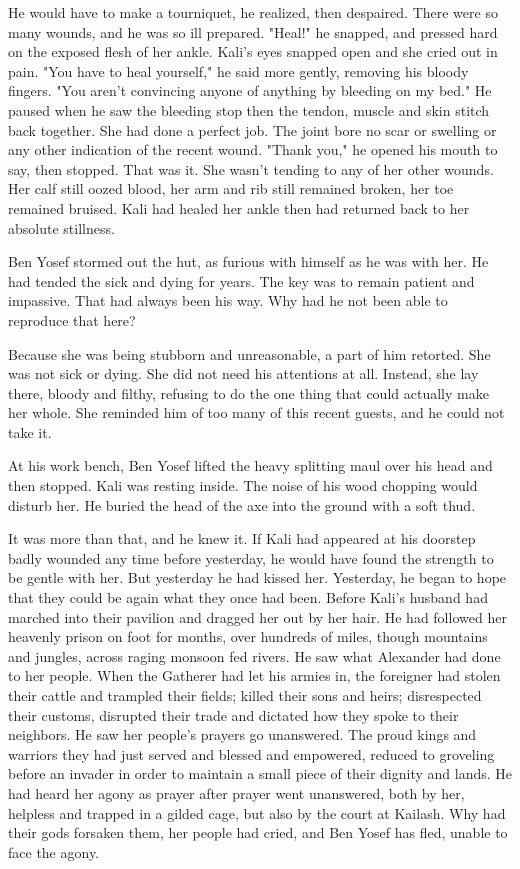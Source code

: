 \documentclass{amsart}
\begin{document}
He would have to make a tourniquet, he realized, then despaired. There were so many wounds, and he was so ill prepared. "Heal!" he snapped, and pressed hard on the exposed flesh of her ankle. Kali's eyes snapped open and she cried out in pain. "You have to heal yourself," he said more gently, removing his bloody fingers. "You aren't convincing anyone of anything by bleeding on my bed." He paused when he saw the bleeding stop then the tendon, muscle and skin stitch back together. She had done a perfect job. The joint bore no scar or swelling or any other indication of the recent wound. "Thank you," he opened his mouth to say, then stopped. That was it. She wasn't tending to any of her other wounds. Her calf still oozed blood, her arm and rib still remained broken, her toe remained bruised. Kali had healed her ankle then had returned back to her absolute stillness. 

Ben Yosef stormed out the hut, as furious with himself as he was with her. He had tended the sick and dying for years. The key was to remain patient and impassive. That had always been his way. Why had he not been able to reproduce that here? 

Because she was being stubborn and unreasonable, a part of him retorted. She was not sick or dying. She did not need his attentions at all. Instead, she lay there, bloody and filthy, refusing to do the one thing that could actually make her whole. She reminded him of too many of this recent guests, and he could not take it.

At his work bench, Ben Yosef lifted the heavy splitting maul over his head and then stopped. Kali was resting inside. The noise of his wood chopping would disturb her. He buried the head of the axe into the ground with a soft thud.

It was more than that, and he knew it. If Kali had appeared at his doorstep badly wounded any time before yesterday, he would have found the strength to be gentle with her. But yesterday he had kissed her. Yesterday, he began to hope that they could be again what they once had been. Before Kali's husband had marched into their pavilion and dragged her out by her hair. He had followed her heavenly prison on foot for months, over hundreds of miles, though mountains and jungles, across raging monsoon fed rivers. He saw what Alexander had done to her people. When the Gatherer had let his armies in, the foreigner had stolen their cattle and trampled their fields; killed their sons and heirs; disrespected their customs, disrupted their trade and dictated how they spoke to their neighbors. He saw her people's prayers go unanswered. The proud kings and warriors they had just served and blessed and empowered, reduced to groveling before an invader in order to maintain a small piece of their dignity and lands. He had heard her agony as prayer after prayer went unanswered, both by her, helpless and trapped in a gilded cage, but also by the court at Kailash. Why had their gods forsaken them, her people had cried, and Ben Yosef has fled, unable to face the agony.
\end{document}
